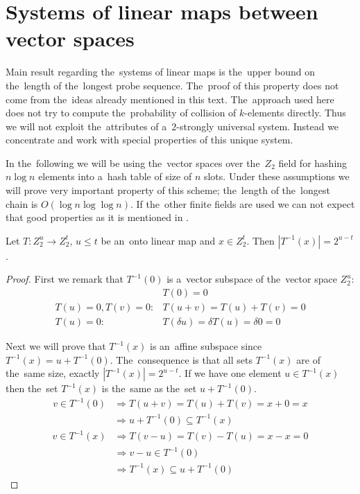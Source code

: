 \chapter{Systems of linear maps between vector spaces}

Main result regarding the~systems of linear maps is the~upper bound on the~length of the~longest probe sequence. The~proof of this property does not come from the~ideas already mentioned in this text. The~approach used here does not try to compute the~probability of collision of $k$-elements directly. Thus we will not exploit the~attributes of a~$2$-strongly universal system. Instead we concentrate and work with special properties of this unique system.

In the~following we will be using the~vector spaces over the~$Z_2$ field for hashing $n \log n$ elements into a~hash table of size of $n$ slots. Under these assumptions we will prove very important property of this scheme; the~length of the~longest chain is $O(\log n \log \log n)$. If the~other finite fields are used we can not expect that good properties as it is mentioned in \cite{linear-hash-functions}.

\begin{lemma}
\label{lemma-linear-transformation-domain-distribution}
Let $T: Z_2^u \rightarrow Z_2^t$, $u \leq t$ be an~onto linear map and $x \in Z_2^t$. Then $|T^{-1}(x)| = 2 ^ {u-t}$.
\end{lemma}
\begin{proof}
First we remark that $T^{-1}(0)$ is a~vector subspace of the~vector space $Z_2^u$:
\begin{displaymath}
\begin{split}
& T(0) = 0 \\
T(u) = 0, T(v) = 0: & T(u + v) = T(u) + T(v) = 0 \\
T(u) = 0: & T(\delta u) = \delta T(u) = \delta 0 = 0
\end{split}
\end{displaymath}

Next we will prove that $T^{-1}(x)$ is an~affine subspace since $T^{-1}(x) = u + T^{-1}(0)$. The~consequence is that all sets $T^{-1}(x)$ are of the~same size, exactly $|T^{-1}(x)| = 2^{u-t}$. If we have one element $u \in T^{-1}(x)$ then the~set $T^{-1}(x)$ is the~same as the~set $u + T^{-1}(0)$.
\begin{displaymath}
\begin{split}
v \in T^{-1}(0) 
	& \Rightarrow T(u+v) = T(u) + T(v) = x + 0 = x  \\
	& \Rightarrow u + T^{-1}(0) \subseteq T^{-1}(x)
\end{split}
\end{displaymath}
\begin{displaymath}
\begin{split}
v \in T^{-1}(x) 
	& \Rightarrow T(v-u) = T(v) - T(u) = x - x = 0 \\
	& \Rightarrow v - u \in T^{-1}(0) \\
	& \Rightarrow T^{-1}(x) \subseteq u + T^{-1}(0)
\end{split}
\end{displaymath}
\end{proof}


